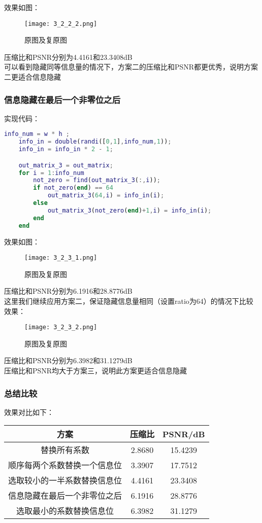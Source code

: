 \documentclass[12pt]{article}
\begin{document}
效果如图：
\begin{figure}[H]
    \centering
    \texttt{[image: 3\_2\_2\_2.png]}
    \caption{原图及复原图}
\end{figure}

压缩比和PSNR分别为4.4161和23.3408dB\\
可以看到隐藏同等信息量的情况下，方案二的压缩比和PSNR都更优秀，说明方案二更适合信息隐藏

\subsubsection{信息隐藏在最后一个非零位之后}

实现代码：
\begin{lstlisting}[language=matlab]
    info_num = w * h ;
    info_in = double(randi([0,1],info_num,1));
    info_in = info_in * 2 - 1;

    out_matrix_3 = out_matrix;
    for i = 1:info_num
        not_zero = find(out_matrix_3(:,i));
        if not_zero(end) == 64
            out_matrix_3(64,i) = info_in(i);
        else
            out_matrix_3(not_zero(end)+1,i) = info_in(i);
        end
    end
\end{lstlisting}

效果如图：
\begin{figure}[H]
    \centering
    \texttt{[image: 3\_2\_3\_1.png]}
    \caption{原图及复原图}
\end{figure}

压缩比和PSNR分别为6.1916和28.8776dB \\

这里我们继续应用方案二，保证隐藏信息量相同（设置ratio为64）的情况下比较效果：
\begin{figure}[H]
    \centering
    \texttt{[image: 3\_2\_3\_2.png]}
    \caption{原图及复原图}
\end{figure}

压缩比和PSNR分别为6.3982和31.1279dB \\
\hspace*{2em}压缩比和PSNR均大于方案三，说明此方案更适合信息隐藏

\subsubsection{总结比较}

效果对比如下：
\begin{table}[H]
    \centering
    \begin{tabular}{|c|c|c|}
    \hline
    方案 & 压缩比 & PSNR/dB  \\
    \hline
    替换所有系数 & 2.8680 & 15.4239  \\
    \hline
    顺序每两个系数替换一个信息位 & 3.3907 & 17.7512  \\
    \hline
    选取较小的一半系数替换信息位 & 4.4161 & 23.3408  \\
    \hline
    信息隐藏在最后一个非零位之后 & 6.1916 & 28.8776  \\
    \hline
    选取最小的系数替换信息位 & 6.3982 & 31.1279  \\
    \hline
    \end{tabular}
\end{table}
\end{document}
